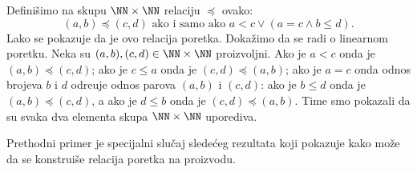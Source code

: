 \begin{EX}
  Defini\v simo na skupu $\NN \times \NN$ relaciju $\preccurlyeq$ ovako:
  $$
    (a, b) \preccurlyeq (c, d) \text{\ \ ako i samo ako\ \ } a < c \lor (a = c \land b \le d).
  $$
  Lako se pokazuje da je ovo relacija poretka. Doka\v zimo da se radi o linearnom poretku. Neka su
  $(a, b), (c, d) \in \NN \times \NN$ proizvoljni. Ako je $a < c$ onda je
  $(a, b) \preccurlyeq (c, d)$; ako je $c \le a$ onda je $(c, d) \preccurlyeq (a, b)$; ako je $a = c$
  onda odnos brojeva $b$ i $d$ odre\dj uje odnos parova $(a, b)$ i $(c, d)$: ako je $b \le d$ onda je
  $(a, b) \preccurlyeq (c, d)$, a ako je $d \le b$ onda je $(c, d) \preccurlyeq (a, b)$. Time smo pokazali da su
  svaka dva elementa skupa $\NN \times \NN$ uporediva.
\end{EX}

Prethodni primer je specijalni slu\v caj slede\'ceg rezultata koji pokazuje kako mo\v ze da se konstrui\v se
relacija poretka na proizvodu.

